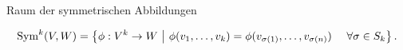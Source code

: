 \documentclass[class=article, crop=false]{standalone}
\begin{document}
\begin{zettel}{Raum der symmetrischen Abbildungen}
\begin{flashcard}[vuiucko9]{}
	\begin{definition}
		\[
			\Sym^k (V,W ) = \set{\phi : V^k \to  W}{\phi (v_1, \dots,v_k) = \phi (v_{\sigma(1)}, \dots , v_{\sigma(n)}) \quad \forall \sigma \in  S_k}
		.\]
	\end{definition}
\end{flashcard}
\end{zettel}
\end{document}

